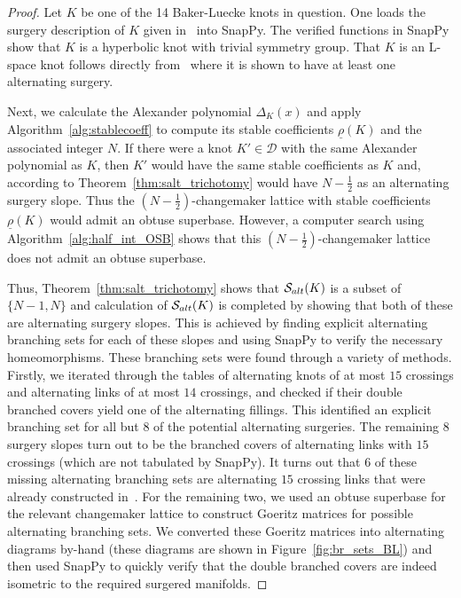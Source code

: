 \documentclass{amsart} %
\newcommand{\D}{\mathcal{D}}
\newcommand{\Salt}{\mathcal{S}_{\rm alt}}
\theoremstyle{thm}
\theoremstyle{definition}
\numberwithin{equation}{section}
\begin{document}
\begin{proof}
Let $K$ be one of the 14 Baker-Luecke knots in question. One loads the surgery description of $K$ given in~\cite{BL17} into SnapPy. The verified functions in SnapPy show that $K$ is a hyperbolic knot with trivial symmetry group. That $K$ is an L-space knot follows directly from~\cite{BL17} where it is shown to have at least one alternating surgery.
    
Next, we calculate the Alexander polynomial $\Delta_K(x)$ and apply Algorithm~\ref{alg:stablecoeff} to compute its stable coefficients $\underline{\rho}(K)$ and the associated integer $N$. If there were a knot $K'\in \D$ with the same Alexander polynomial as $K$, then $K'$ would have the same stable coefficients as $K$ and, according to Theorem~\ref{thm:salt_trichotomy} would have $N-\frac{1}{2}$ as an alternating surgery slope. Thus the $(N-\frac{1}{2})$-changemaker lattice with stable coefficients $\underline{\rho}(K)$ would admit an obtuse superbase. However, a computer search using Algorithm~\ref{alg:half_int_OSB} shows that this $(N-\frac{1}{2})$-changemaker lattice does not admit an obtuse superbase. 

Thus, Theorem~\ref{thm:salt_trichotomy} shows that $\Salt(K)$ is a subset of $\{N-1, N\}$ and calculation of $\Salt(K)$ is completed by showing that both of these are alternating surgery slopes. This is achieved by finding explicit alternating branching sets for each of these slopes and using SnapPy to verify the necessary homeomorphisms. These branching sets were found through a variety of methods. Firstly, we iterated through the tables of alternating knots of at most $15$ crossings and alternating links of at most $14$ crossings, and checked if their double branched covers yield one of the alternating fillings. This identified an explicit branching set for all but $8$ of the potential alternating surgeries. The remaining $8$ surgery slopes turn out to be the branched covers of alternating links with $15$ crossings (which are not tabulated by SnapPy). It turns out that $6$ of these missing alternating branching sets are alternating $15$ crossing links that were already constructed in~\cite{BL17}. For the remaining two, we used an obtuse superbase for the relevant changemaker lattice to construct Goeritz matrices for possible alternating branching sets. We converted these Goeritz matrices into alternating diagrams by-hand (these diagrams are shown in Figure~\ref{fig:br_sets_BL}) and then used SnapPy to quickly verify that the double branched covers are indeed isometric to the required surgered manifolds.
\end{proof}
\end{document}

